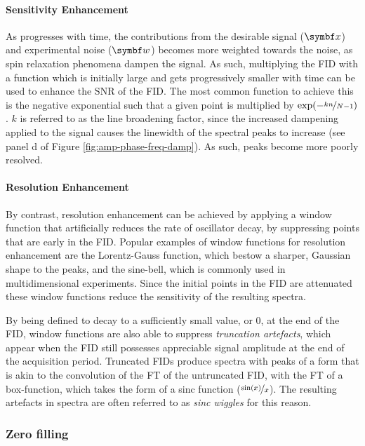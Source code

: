 \paragraph{Sensitivity Enhancement} As  progresses with time, the
contributions from the desirable signal ($\bx$) and experimental noise ($\bw$)
becomes more
weighted towards the noise, as spin relaxation phenomena dampen the signal. As
such, multiplying the \ac{FID} with a function which is initially large and
gets progressively smaller with time can be used to enhance the \ac{SNR} of the
\ac{FID}. The most common function to achieve this is the negative exponential
such that a given point is multiplied by $\exp(-\nicefrac{k n}{N - 1})$.
$k$ is referred to as the line broadening factor, since the increased dampening
applied to the signal causes the linewidth of the spectral peaks to increase
(see panel d of Figure \ref{fig:amp-phase-freq-damp}). As such, peaks become
more poorly resolved.

\paragraph{Resolution Enhancement} By contrast, resolution enhancement can be
achieved by applying a window function that artificially reduces the rate of
oscillator decay, by suppressing points that are early in the \ac{FID}. Popular
examples of window functions for resolution enhancement are the Lorentz-Gauss
function, which bestow a sharper, Gaussian shape to the peaks, and the
sine-bell, which is commonly used in multidimensional experiments. Since the
initial points in the \ac{FID} are attenuated these window functions reduce the
sensitivity of the resulting spectra.

By being defined to decay to a sufficiently small value, or $0$, at the end of
the \ac{FID}, window functions are also able to suppress \emph{truncation
artefacts}, which appear when the \ac{FID} still possesses appreciable signal
amplitude at the end of the acquisition period. Truncated \acp{FID} produce
spectra with peaks of a form that is akin to the convolution of the \ac{FT} of
the untruncated \ac{FID}, with the \ac{FT} of a box-function, which takes the
form of a sinc function ($\nicefrac{\sin(x)}{x}$). The resulting artefacts in
spectra are often referred to as \emph{sinc wiggles} for this reason.

\subsubsection{Zero filling}

